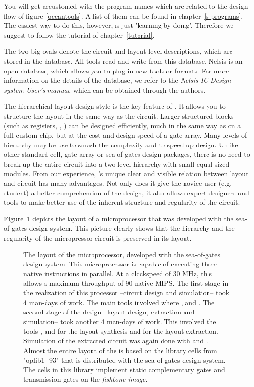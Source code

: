 You will get accustomed with the program names which are related to the design
flow of figure~\ref{oceantools}. A list of them can be found in
chapter~\ref{s-programs}. The easiest way to do this, however, is just
'learning by doing'. Therefore we suggest to follow the tutorial of
chapter~\ref{tutorial}.

The two big ovals denote the circuit and layout level descriptions, which are
stored in the  database. All tools read and write from this
database. Nelsis is an open database, which allows you to plug in new tools or
formats. For more information on the details of the database, we refer to the
{\sl Nelsis IC Design system User's manual}, which can be obtained through the
authors.

The hierarchical layout design style is the key feature of . It
allows you to structure the layout in the same way as the circuit. Larger
structured blocks (such as registers, , ) can be designed
efficiently, much in the same way as on a full-custom chip, but at the cost and
design speed of a gate-array.  Many levels of hierarchy may be use to smash the
complexity and to speed up design.  Unlike other standard-cell, gate-array or
sea-of-gates design packages, there is no need to break up the entire circuit
into a two-level hierarchy with small equal-sized modules. From our experience,
's unique clear and visible relation between layout and circuit has
many advantages. Not only does it give the novice user (e.g. student) a better
comprehension of the design, it also allows expert designers and tools to make
better use of the inherent structure and regularity of the circuit.

Figure~\ref{f-minimove} depicts the layout of a microprocessor that was
developed with the  sea-of-gates design system. This picture clearly
shows that the hierarchy and the regularity of the micropressor circuit is
preserved in its layout.
\begin{figure}
\centerline{}
\caption{
The layout of the  microprocessor, developed with the 
sea-of-gates design system. This microprocessor is capable of executing three
native instructions in parallel.  At a clockspeed of 30 MHz, this allows a
maximum throughput of 90 native MIPS. The first stage in the realization of
this processor --circuit design and simulation-- took 4 man-days of work. The
main tools involved where ,  and . The second
stage of the design --layout design, extraction and simulation-- took another 4
man-days of work. This involved the tools ,  and
 for the layout synthesis and  for the layout
extraction. Simulation of the extracted circuit was again done with
 and . Almost the entire layout of the  is
based on the library cells from "oplib1\_93" that is distributed with the
 sea-of-gates design system. The cells in this library implement
static complementary  gates and transmission gates on the
\sl{fishbone} image.  }
\label{f-minimove}
\end{figure}

